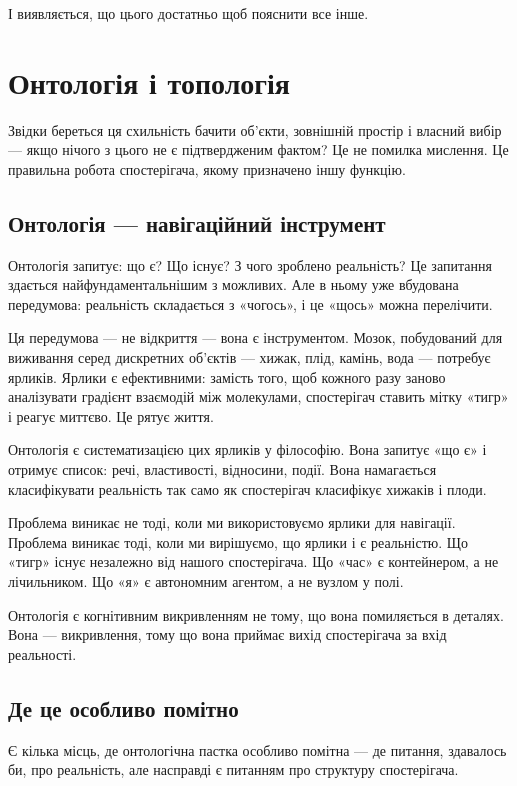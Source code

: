 \documentclass[12pt, a4paper, openany]{book}
\begin{document}
І виявляється, що цього достатньо щоб пояснити все інше.

\chapter{Онтологія і топологія}

Звідки береться ця схильність бачити об'єкти, зовнішній простір і власний вибір — якщо нічого з цього не є підтвердженим фактом? Це не помилка мислення. Це правильна робота спостерігача, якому призначено іншу функцію.

\section{Онтологія — навігаційний інструмент}

Онтологія запитує: що є? Що існує? З чого зроблено реальність? Це запитання здається найфундаментальнішим з можливих. Але в ньому уже вбудована передумова: реальність складається з «чогось», і це «щось» можна перелічити.

Ця передумова — не відкриття — вона є інструментом. Мозок, побудований для виживання серед дискретних об'єктів — хижак, плід, камінь, вода — потребує ярликів. Ярлики є ефективними: замість того, щоб кожного разу заново аналізувати градієнт взаємодій між молекулами, спостерігач ставить мітку «тигр» і реагує миттєво. Це рятує життя.

Онтологія є систематизацією цих ярликів у філософію. Вона запитує «що є» і отримує список: речі, властивості, відносини, події. Вона намагається класифікувати реальність так само як спостерігач класифікує хижаків і плоди.

Проблема виникає не тоді, коли ми використовуємо ярлики для навігації. Проблема виникає тоді, коли ми вирішуємо, що ярлики і є реальністю. Що «тигр» існує незалежно від нашого спостерігача. Що «час» є контейнером, а не лічильником. Що «я» є автономним агентом, а не вузлом у полі.

Онтологія є когнітивним викривленням не тому, що вона помиляється в деталях. Вона — викривлення, тому що вона приймає вихід спостерігача за вхід реальності.

\section{Де це особливо помітно}

Є кілька місць, де онтологічна пастка особливо помітна — де питання, здавалось би, про реальність, але насправді є питанням про структуру спостерігача.
\end{document}
